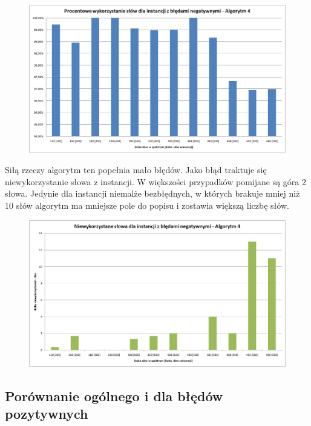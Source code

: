 \documentclass[a4paper,10pt]{article}
\begin{document}
\begin{figure}[h]
  \footnotesize\centering
  \includegraphics[width=\textwidth,keepaspectratio]{percentageUsedWords_negative.png}
\end{figure}

Siłą rzeczy algorytm ten popełnia mało błędów. Jako błąd traktuje się niewykorzystanie słowa z instancji. W większości 
przypadków pomijane są góra 2 słowa. Jedynie dla instancji niemalże bezbłędnych, w których brakuje mniej niż 10 słów algorytm ma mniejsze pole do popisu i zostawia większą liczbę słów.

\begin{figure}[h]
  \footnotesize\centering
  \includegraphics[width=\textwidth,keepaspectratio]{unusedWords_negative.png}
\end{figure}

\subsection{Porównanie ogólnego i dla błędów pozytywnych}
\end{document}
